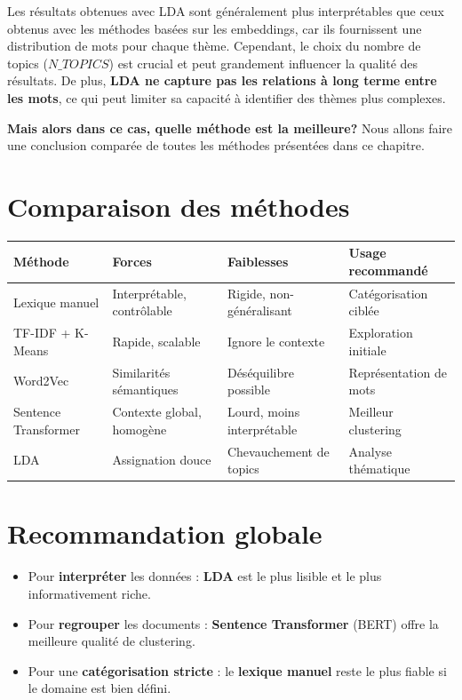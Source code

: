 \documentclass[12pt,a4paper]{report}
\renewcommand{\arraystretch}{1}
\begin{document}
\bigskip

Les résultats obtenues avec LDA sont généralement plus interprétables que ceux obtenus avec les méthodes basées sur les embeddings, car ils fournissent une distribution de mots pour chaque thème. 
Cependant, le choix du nombre de topics ($N\_TOPICS$) est crucial et peut grandement influencer la qualité des résultats. De plus, \textbf{LDA ne capture pas les relations à long terme entre les mots}, ce qui peut limiter sa capacité à identifier des thèmes plus complexes.

\smallskip
\textbf{Mais alors dans ce cas, quelle méthode est la meilleure?} Nous allons faire une conclusion comparée de toutes les méthodes présentées dans ce chapitre.

\section{Comparaison des méthodes}

\begin{center}
\renewcommand{\arraystretch}{1.3}
\begin{tabularx}{\textwidth}{@{}>{\raggedright\arraybackslash}p{2.6cm}>{\raggedright\arraybackslash}X>{\raggedright\arraybackslash}X>{\raggedright\arraybackslash}X@{}}
\toprule
\textbf{Méthode} & \textbf{Forces} & \textbf{Faiblesses} & \textbf{Usage recommandé} \\
\midrule
Lexique manuel
  & Interprétable, contrôlable
  & Rigide, non-généralisant
  & Catégorisation ciblée \\
\midrule
TF-IDF + K-Means
  & Rapide, scalable
  & Ignore le contexte
  & Exploration initiale \\
\midrule
Word2Vec
  & Similarités sémantiques
  & Déséquilibre possible
  & Représentation de mots \\
\midrule
Sentence Transformer
  & Contexte global, homogène
  & Lourd, moins interprétable
  & Meilleur clustering \\
\midrule
LDA
  & Assignation douce
  & Chevauchement de topics
  & Analyse thématique \\
\bottomrule
\end{tabularx}
\end{center}

\section*{Recommandation globale}

\begin{itemize}
  \item Pour \textbf{interpréter} les données : \textbf{LDA} est le plus lisible et le plus informativement riche.
  \item Pour \textbf{regrouper} les documents : \textbf{Sentence Transformer} (BERT) offre la meilleure qualité de clustering.
  \item Pour une \textbf{catégorisation stricte} : le \textbf{lexique manuel} reste le plus fiable si le domaine est bien défini.
\end{itemize}
\end{document}
